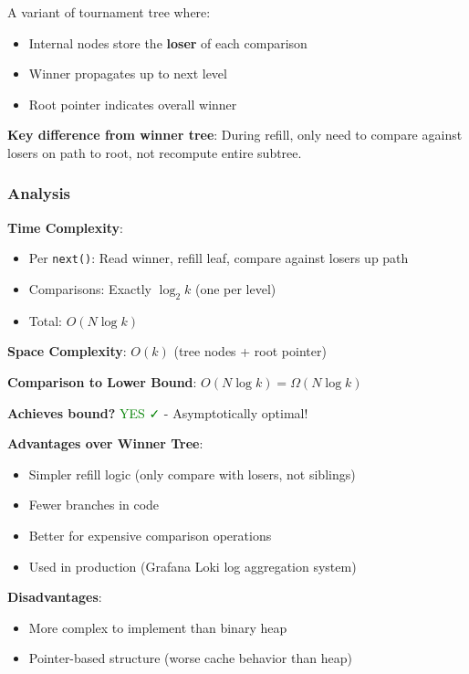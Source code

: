 \documentclass[11pt]{article}
\begin{document}
A variant of tournament tree where:
\begin{itemize}
    \item Internal nodes store the \textbf{loser} of each comparison
    \item Winner propagates up to next level
    \item Root pointer indicates overall winner
\end{itemize}

\textbf{Key difference from winner tree}: During refill, only need to compare against losers on path to root, not recompute entire subtree.

\subsubsection{Analysis}

\textbf{Time Complexity}:
\begin{itemize}
    \item Per \texttt{next()}: Read winner, refill leaf, compare against losers up path
    \item Comparisons: Exactly $\log_2 k$ (one per level)
    \item Total: $O(N \log k)$
\end{itemize}

\textbf{Space Complexity}: $O(k)$ (tree nodes + root pointer)

\textbf{Comparison to Lower Bound}: $O(N \log k) = \Omega(N \log k)$

\textbf{Achieves bound?} \textcolor{green}{YES ✓} - Asymptotically optimal!

\textbf{Advantages over Winner Tree}:
\begin{itemize}
    \item Simpler refill logic (only compare with losers, not siblings)
    \item Fewer branches in code
    \item Better for expensive comparison operations
    \item Used in production (Grafana Loki log aggregation system)
\end{itemize}

\textbf{Disadvantages}:
\begin{itemize}
    \item More complex to implement than binary heap
    \item Pointer-based structure (worse cache behavior than heap)
\end{itemize}
\end{document}
